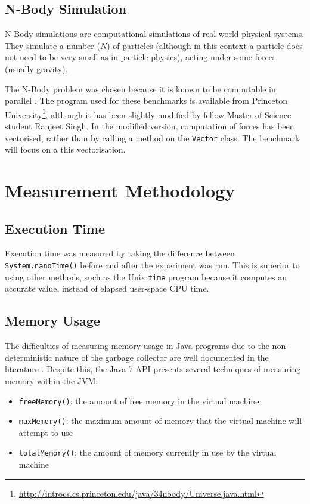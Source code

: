 	\subsection{N-Body Simulation} \label{sec:methodology/benchmarks/nbody}
	N-Body simulations \citep{Trenti2008} are computational simulations of real-world physical systems. They simulate a number ($N$) of particles (although in this context a particle does not need to be very small as in particle physics), acting under some forces (usually gravity).
	
	The N-Body problem was chosen because it is known to be computable in parallel \citep{Warren1993,Nyland2007}. The program used for these benchmarks is available from Princeton University\footnote{\url{http://introcs.cs.princeton.edu/java/34nbody/Universe.java.html}}, although it has been slightly modified by fellow Master of Science student Ranjeet Singh. In the modified version, computation of forces has been vectorised, rather than by calling a method on the \texttt{Vector} class. The benchmark will focus on a this vectorisation.
	
\section{Measurement Methodology} \label{sec:methodology/measurements}
	\subsection{Execution Time} \label{sec:methodology/measurements/time}
	Execution time was measured by taking the difference between \texttt{System.nanoTime()} before and after the experiment was run. This is superior to using other methods, such as the Unix \texttt{time} program because it computes an accurate value, instead of elapsed user-space CPU time.
	
	\subsection{Memory Usage} \label{sec:methodology/measurements/memory}
	The difficulties of measuring memory usage in Java programs due to the non-deterministic nature of the garbage collector are well documented in the literature \citep{Kim2000,Ogata2010}. Despite this, the Java 7 API presents several techniques \citep{RuntimeDocs} of measuring memory within the JVM:
	
	\begin{itemize}
		\item \texttt{freeMemory()}: the amount of free memory in the virtual machine
		\item \texttt{maxMemory()}: the maximum amount of memory that the virtual machine will attempt to use
		\item \texttt{totalMemory()}: the amount of memory currently in use by the virtual machine
	\end{itemize}
	

